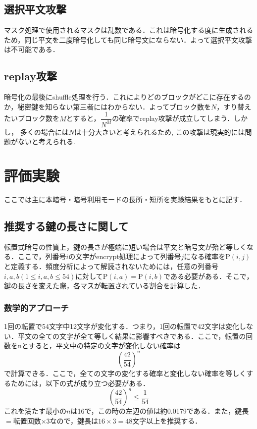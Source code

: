 \documentclass[titlepage]{jarticle}
\begin{document}
\subsection{選択平文攻撃}
マスク処理で使用されるマスクは乱数である．これは暗号化する度に生成されるため，同じ平文を二度暗号化しても同じ暗号文にならない．よって選択平文攻撃は不可能である．

\subsection{replay攻撃}
暗号化の最後にshuffle処理を行う．これによりどのブロックがどこに存在するのか，秘密鍵を知らない第三者にはわからない．よってブロック数を\(N\)，すり替えたいブロック数を\(M\)とすると，\(\dfrac{1}{N^M}\)の確率でreplay攻撃が成立してしまう．しかし， 多くの場合には\(N\)は十分大きいと考えられるため, この攻撃は現実的には問題がないと考えられる.

\section{評価実験}
ここでは主に本暗号・暗号利用モードの長所・短所を実験結果をもとに記す．
\subsection{推奨する鍵の長さに関して}
転置式暗号の性質上，鍵の長さが極端に短い場合は平文と暗号文が殆ど等しくなる．ここで，列番号\(i\)の文字がencrypt処理によって列番号\(j\)になる確率を\(\mathrm{P}(i,j)\)と定義する．頻度分析によって解読されないためには，任意の列番号\(i,a,b(1\leq i,a,b\leq 54)\)に対して\(\mathrm{P}(i,a)=\mathrm{P}(i,b)\)である必要がある．そこで，鍵の長さを変えた際，各マスが転置されている割合を計算した．\\

\subsubsection{数学的アプローチ}
1回の転置で54文字中12文字が変化する．つまり，1回の転置で42文字は変化しない．平文の全ての文字が全て等しく結果に影響すべきである．ここで，転置の回数をnとすると，平文中の特定の文字が変化しない確率は
\[\left(\frac{42}{54}\right)^n\]
で計算できる．ここで，全ての文字の変化する確率と変化しない確率を等しくするためには，以下の式が成り立つ必要がある．
\[\left(\frac{42}{54}\right)^n \leq \frac{1}{54}\]
これを満たす最小の\(n\)は16で，この時の左辺の値は約0.0179である．また，鍵長\(=\)転置回数\(\times 3\)なので，鍵長は\(16\times3=48\)文字以上を推奨する．
\end{document}
